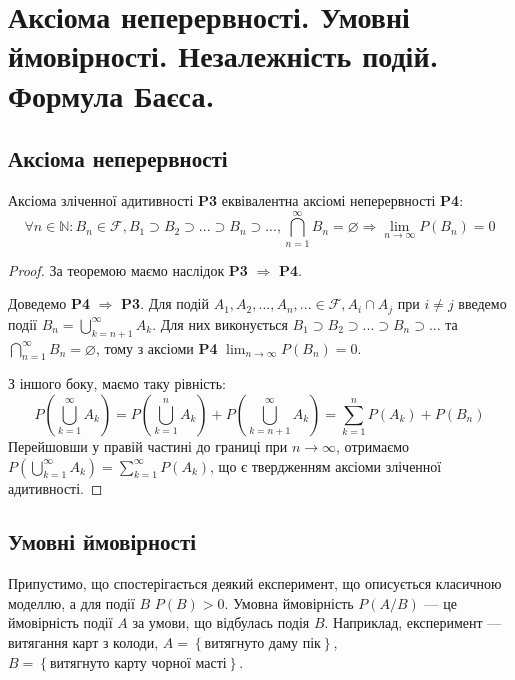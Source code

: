 \section{Аксіома неперервності. Умовні ймовірності. Незалежність подій. Формула Баєса.}

\subsection{Аксіома неперервності}
\begin{theorem}
    Аксіома зліченної адитивності \textbf{P3} еквівалентна аксіомі неперервності
    \textbf{P4}: $$\forall n \in \mathbb{N}: B_n \in \mathcal{F}, B_1 \supset B_2 \supset ... \supset B_n \supset ..., \bigcap_{n=1}^{\infty} B_n = \varnothing \Rightarrow \lim_{n\rightarrow \infty} P(B_n) = 0$$
    \begin{proof}
        За теоремою  маємо наслідок \textbf{P3} $\Rightarrow$ \textbf{P4}.

        Доведемо \textbf{P4} $\Rightarrow$ \textbf{P3}. Для подій $A_1, A_2, ... , A_n, ... \in \mathcal{F}, A_i \cap A_j \text{ при } i \neq j$
        введемо події $B_n = \bigcup_{k=n+1}^{\infty} A_k$. Для них виконується $B_1 \supset B_2 \supset ... \supset B_n \supset ...$ та $\bigcap_{n=1}^{\infty} B_n = \varnothing$,
        тому з аксіоми \textbf{P4} $\lim_{n\rightarrow \infty} P(B_n) = 0$.

        З іншого боку, маємо таку рівність:
        $$P\left(\bigcup_{k=1}^{\infty} A_k\right) = P\left(\bigcup_{k=1}^{n} A_k\right) + P\left(\bigcup_{k=n+1}^{\infty} A_k\right) = \sum_{k=1}^{n} P(A_k) + P(B_n)$$
        Перейшовши у правій частині до границі при $n \rightarrow \infty$, отримаємо $P\left(\bigcup_{k=1}^{\infty} A_k\right) = \sum_{k=1}^{\infty} P(A_k)$, 
        що є твердженням аксіоми зліченної адитивності.
    \end{proof}
\end{theorem}

\subsection{Умовні ймовірності}
Припустимо, що спостерігається деякий експеримент, що описується класичною моделлю, а для події $B$ $P(B)>0$.
Умовна ймовірність $P(A/B)$ --- це ймовірність події $A$ за умови, що відбулась подія $B$.
Наприклад, експеримент --- витягання карт з колоди, $A=\left\{\text{витягнуто даму пік}\right\}$, $B=\left\{\text{витягнуто карту чорної масті}\right\}$.

